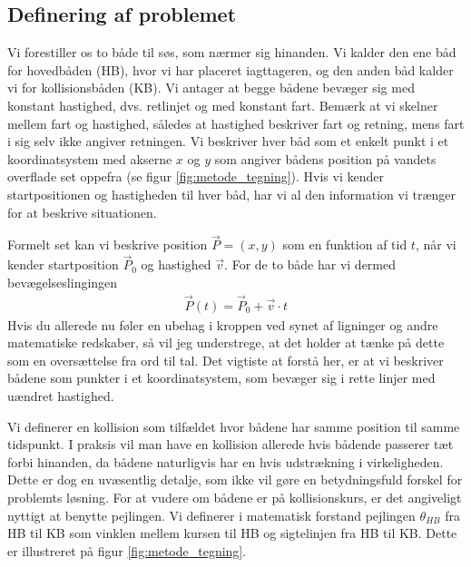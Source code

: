 \documentclass[%
 reprint,
nofootinbib,
aps,
]{revtex4-1}
\begin{document}
\subsection{Definering af problemet}
Vi forestiller os to både til søs, som nærmer sig hinanden. Vi kalder den ene båd for hovedbåden (HB), hvor vi har placeret iagttageren, og den anden båd kalder vi for kollisionsbåden (KB). Vi antager at begge bådene bevæger sig med konstant hastighed, dvs. retlinjet og med konstant fart. Bemærk at vi skelner mellem fart og hastighed, således at hastighed beskriver fart og retning, mens fart i sig selv ikke angiver retningen. Vi beskriver hver båd som et enkelt punkt i et koordinatsystem med akserne $x$ og $y$ som angiver bådens position på vandets overflade set oppefra (se figur \ref{fig:metode_tegning}). Hvis vi kender startpositionen og hastigheden til hver båd, har vi al den information vi trænger for at beskrive situationen. \par Formelt set kan vi beskrive position $\vec{P} = (x, y)$ som en funktion af tid $t$, når vi kender startposition $\vec{P}_0$ og hastighed $\vec{v}$. For de to både har vi dermed bevægelseslingingen
\begin{align}
  \vec{P}(t) =  \vec{P}_0 + \vec{v}\cdot t
  \label{eq:motion}
\end{align}
Hvis du allerede nu føler en ubehag i kroppen ved synet af ligninger og andre matematiske redskaber, så vil jeg understrege, at det holder at tænke på dette som en oversættelse fra ord til tal. Det vigtiste at forstå her, er at vi beskriver bådene som punkter i et koordinatsystem, som bevæger sig i rette linjer med uændret hastighed. \par
Vi definerer en kollision som tilfældet hvor bådene har samme position til samme tidspunkt. I praksis vil man have en kollision allerede hvis bådende passerer tæt forbi hinanden, da bådene naturligvis har en hvis udstrækning i virkeligheden. Dette er dog en uvæsentlig detalje, som ikke vil gøre en betydningsfuld forskel for problemts løsning. For at vudere om bådene er på kollisionskurs, er det angiveligt nyttigt at benytte pejlingen. Vi definerer i matematisk forstand pejlingen $\theta_{HB}$ fra HB til KB som vinklen mellem kursen til HB og sigtelinjen fra HB til KB. Dette er illustreret på figur \ref{fig:metode_tegning}.
\end{document}
